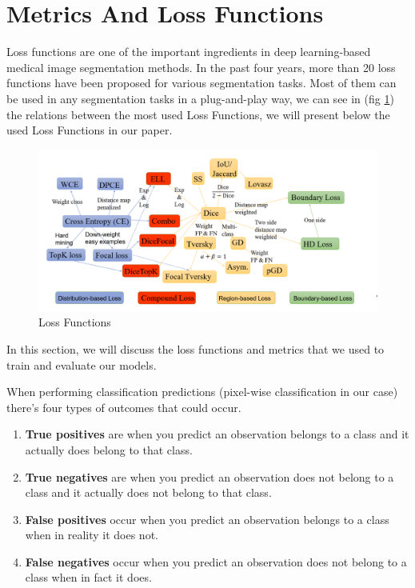 \section{Metrics And Loss Functions}
\hspace{\parindent}
Loss functions are one of the important ingredients in deep learning-based medical image segmentation methods. In the past four years, more than 20 loss functions have been proposed for various segmentation tasks. Most of them can be used in any segmentation tasks in a plug-and-play way, we can see in (fig \ref{fig:LossFunctions}) the relations between the most used Loss Functions, we will present below the used Loss Functions in our paper.

\begin{figure}[H]
\centering
  \vspace{-0.1in}
    \centerline{\includegraphics[width = \linewidth]{../images/LossFunctions.png}}
    \caption{Loss Functions}
    \label{fig:LossFunctions}
\end{figure}

In this section, we will discuss the loss functions and metrics that we used to train and evaluate our models.

When performing classification predictions (pixel-wise classification in our case) there's four types of outcomes that could occur.

\begin{enumerate}
    \item \textbf{True positives} are when you predict an observation belongs to a class and it actually does belong to that class.
    \item \textbf{True negatives} are when you predict an observation does not belong to a class and it actually does not belong to that class.
    \item \textbf{False positives} occur when you predict an observation belongs to a class when in reality it does not.
    \item \textbf{False negatives} occur when you predict an observation does not belong to a class when in fact it does.
\end{enumerate}

